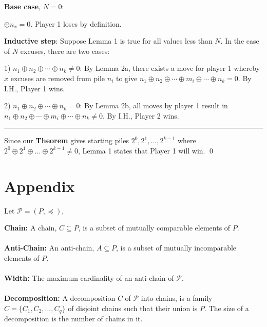 \documentclass[addpoints]{exam}
\begin{document}
\begin{questions}
\begin{solution}
\textbf{Base case}, $N=0$:

$\oplus n_x = 0$. Player 1 loses by definition.

\textbf{Inductive step}: Suppose Lemma 1 is true for all values less than $N$. In the case of $N$ excuses, there are two cases:

1)  $n_1 \oplus n_2 \oplus \cdots \oplus n_k \not = 0$: By Lemma 2a, there exists a move for player 1 whereby $x$ excuses are removed from pile $n_i$ to give $n_1 \oplus n_2 \oplus \cdots \oplus m_i \oplus \cdots \oplus n_k = 0$. By I.H., Player 1 wins. 

2)  $n_1 \oplus n_2 \oplus \cdots \oplus n_k = 0$: By Lemma 2b, all moves by player 1 result in $n_1 \oplus n_2 \oplus \cdots \oplus m_i \oplus \cdots \oplus n_k \not = 0$. By I.H., Player 2 wins.\\

\hrule

Since our \textbf{Theorem} gives starting piles $2^0, 2^1,...,2^{k-1}$ where $2^0 \oplus 2^1 \oplus ... \oplus 2^{k-1} \not = 0$, Lemma 1 states that Player 1 will win. \qed 

 	

\end{solution}

\section{Appendix}
Let $\mathcal{P}= (P, \preccurlyeq)$,

\textbf{Chain:} A chain, $C\subseteq P$, is a subset of mutually comparable elements of $P$.\\\\
\textbf{Anti-Chain:} An anti-chain, $A \subseteq P$, is a subset of mutually incomparable elements of $P$.\\\\
\textbf{Width:} The maximum cardinality of an anti-chain of $\mathcal{P}$.\\\\
\textbf{Decomposition:} A decomposition $C$ of $\mathcal{P}$ into chains, is a family $C = \{C_1,C_2,...,C_q\}$ of disjoint chains such that their union is $P$. The size of a decomposition is the number of chains in it.


\end{questions}
\end{document}
